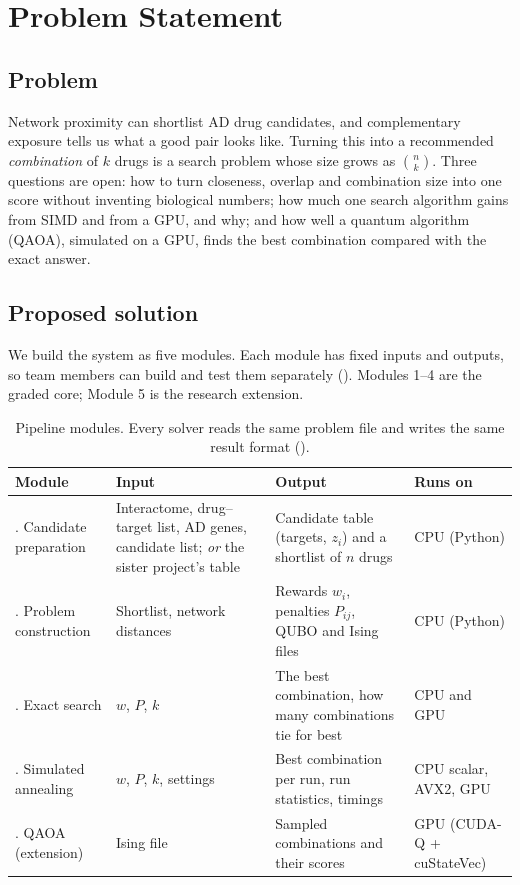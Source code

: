 \section{Problem Statement}
\label{sec:problem}

\subsection{Problem}

Network proximity can shortlist AD drug candidates, and complementary exposure tells us what a good pair looks like. Turning this into a recommended \emph{combination} of $k$ drugs is a search problem whose size grows as $\binom{n}{k}$. Three questions are open: how to turn closeness, overlap and combination size into one score without inventing biological numbers; how much one search algorithm gains from SIMD and from a GPU, and why; and how well a quantum algorithm (QAOA), simulated on a GPU, finds the best combination compared with the exact answer.

\subsection{Proposed solution}

We build the system as five modules. Each module has fixed inputs and outputs, so team members can build and test them separately (). Modules 1--4 are the graded core; Module 5 is the research extension.

\begin{table}[H]
\centering
\small
\begin{tabularx}{\linewidth}{>{\raggedright\arraybackslash}p{3.0cm}>{\raggedright\arraybackslash}X>{\raggedright\arraybackslash}X>{\raggedright\arraybackslash}p{2.2cm}}
\toprule
Module & Input & Output & Runs on \\
\midrule
1. Candidate preparation & Interactome, drug--target list, AD genes, candidate list; \emph{or} the sister project's table & Candidate table (targets, $z_i$) and a shortlist of $n$ drugs & CPU (Python) \\
2. Problem construction & Shortlist, network distances & Rewards $w_i$, penalties $P_{ij}$, QUBO and Ising files & CPU (Python) \\
3. Exact search & $w$, $P$, $k$ & The best combination, how many combinations tie for best & CPU and GPU \\
4. Simulated annealing & $w$, $P$, $k$, settings & Best combination per run, run statistics, timings & CPU scalar, AVX2, GPU \\
5. QAOA (extension) & Ising file & Sampled combinations and their scores & GPU (CUDA-Q + cuStateVec) \\
\bottomrule
\end{tabularx}
\caption{Pipeline modules. Every solver reads the same problem file and writes the same result format ().}
\label{tab:modules}
\end{table}

